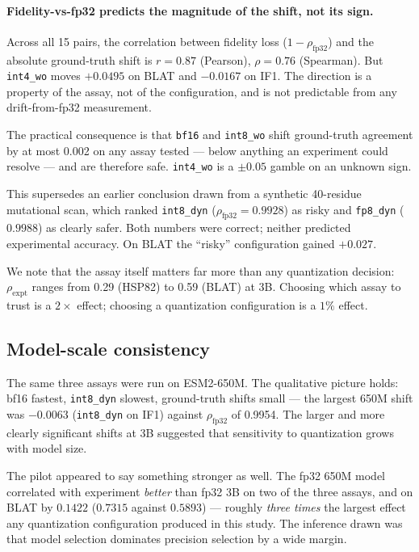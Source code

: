 \documentclass[11pt]{article}
\newcommand{\cfg}[1]{\texttt{#1}}
\begin{document}
\paragraph{Fidelity-vs-fp32 predicts the magnitude of the shift, not its sign.}
Across all 15 pairs, the correlation between fidelity loss
($1 - \rho_{\text{fp32}}$) and the absolute ground-truth shift is
$r = 0.87$ (Pearson), $\rho = 0.76$ (Spearman). But \cfg{int4\_wo} moves
$+0.0495$ on BLAT and $-0.0167$ on IF1. The direction is a property of the
assay, not of the configuration, and is not predictable from any
drift-from-fp32 measurement.

The practical consequence is that \cfg{bf16} and \cfg{int8\_wo} shift
ground-truth agreement by at most 0.002 on any assay tested --- below anything
an experiment could resolve --- and are therefore safe. \cfg{int4\_wo} is a
$\pm 0.05$ gamble on an unknown sign.

This supersedes an earlier conclusion drawn from a synthetic 40-residue mutational
scan, which ranked \cfg{int8\_dyn} ($\rho_{\text{fp32}} = 0.9928$) as risky and
\cfg{fp8\_dyn} ($0.9988$) as clearly safer. Both numbers were correct; neither
predicted experimental accuracy. On BLAT the ``risky'' configuration gained
$+0.027$.

We note that the assay itself matters far more than any quantization decision:
$\rho_{\text{expt}}$ ranges from 0.29 (HSP82) to 0.59 (BLAT) at 3B. Choosing
which assay to trust is a $2\times$ effect; choosing a quantization
configuration is a $1\%$ effect.

\subsection{Model-scale consistency}
\label{sec:pilotscale}

The same three assays were run on ESM2-650M. The qualitative picture holds:
bf16 fastest, \cfg{int8\_dyn} slowest, ground-truth shifts small --- the largest
650M shift was $-0.0063$ (\cfg{int8\_dyn} on IF1) against $\rho_{\text{fp32}}$
of 0.9954. The larger and more clearly significant shifts at 3B suggested that
sensitivity to quantization grows with model size.

The pilot appeared to say something stronger as well. The fp32 650M model
correlated with experiment \emph{better} than fp32 3B on two of the three
assays, and on BLAT by $0.1422$ ($0.7315$ against $0.5893$) --- roughly
\emph{three times} the largest effect any quantization configuration produced in
this study. The inference drawn was that model selection dominates precision
selection by a wide margin.
\end{document}
